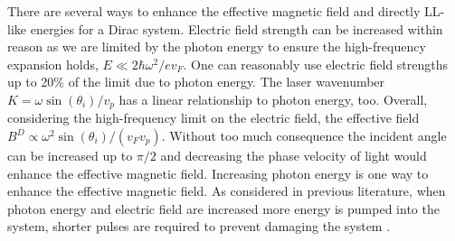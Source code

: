 There are several ways to enhance the effective magnetic field and directly LL-like energies for a Dirac system.
Electric field strength can be increased within reason as we are limited by the photon energy to ensure the high-frequency expansion holds, $E \ll 2\hbar\omega^2/e v_F$.
One can reasonably use electric field strengths up to 20\% of the limit due to photon energy.
The laser wavenumber $K= \omega \sin{(\theta_i)} / v_p$ has a linear relationship to photon energy, too.
Overall, considering the high-frequency limit on the electric field, the effective field $B^D \propto \omega^2 \sin{(\theta_i)} / (v_F v_p)$.
Without too much consequence the incident angle can be increased up to $\pi/2$ and decreasing the phase velocity of light would enhance the effective magnetic field.
Increasing photon energy is one way to enhance the effective magnetic field.
As considered in previous literature, when photon energy and electric field are increased more energy is pumped into the system, shorter pulses are required to prevent damaging the system \cite{YHW, JWM}.

